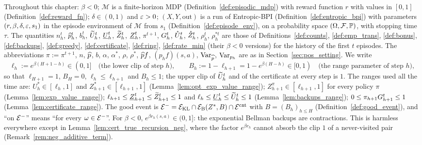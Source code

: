 Throughout this chapter: $\beta < 0$; $\mathcal M$ is a finite-horizon MDP
(Definition~\ref{def:episodic_mdp}) with reward function $r$ with values in $[0, 1]$
(Definition~\ref{def:reward_fn}); $\delta \in (0, 1)$ and $\varepsilon > 0$; $(X, Y, \mathrm{out})$ is a run
of Entropic-BPI (Definition~\ref{def:entropic_bpi}) with parameters $(r, \beta, \delta, \varepsilon, s_1)$
in the episode environment of $\mathcal M$ from $s_1$ (Definition~\ref{def:episode_env}), on a
probability space $(\Omega, \mathcal F, \mathbb{P})$, with stopping time $\tau$. The quantities $n_h^t$,
$\widehat{p}_h^t$, $b_h^t$, $\widetilde{U}_h^t$, $\underline{U}_h^t$, $\widetilde{Z}_h^t$, $\underline{Z}_h^t$, $\pi^{t+1}$, $G_h^t$, $\mathring{U}_h^t$, $\mathring{Z}_h^t$,
$\rho_h^t$, $\rho^{*t}_h$ are those of Definitions~\ref{def:counts}, \ref{def:emp_trans}, \ref{def:bonus},
\ref{def:backups}, \ref{def:greedy}, \ref{def:certificate}, \ref{def:ring}, \ref{def:rate_min}
(their $\beta < 0$ versions) for the history of the first $t$ episodes. The abbreviations
$\pi := \pi^{t+1}$, $n$, $\widehat{p}$, $b$, $\alpha$, $\alpha^*$, $\rho$, $\rho^*$, $\widehat{p} f$, $(p_hf)(s,a)$,
$\operatorname{Var}_{\widehat{p}}$, $\operatorname{Var}_{p_h}$ are as in Section~\ref{sec:pos_setting}. We write
\[
  \ell_h := e^{\beta(H + 1 - h)} \in (0, 1] \quad\text{(the lower clip of step $h$)}, \qquad
  B_h := 1 - \ell_{h+1} = 1 - e^{\beta(H-h)} \in [0, 1) \quad\text{(the range parameter of step $h$)},
\]
so that $\ell_{H+1} = 1$, $B_H = 0$, $\ell_h \le \ell_{h+1}$ and $B_h \le 1$; the upper clip of $\widetilde{U}^t_h$ and
of the certificate at every step is $1$. The ranges used all the time are: $U^*_h \in [\ell_h, 1]$ and
$Z^*_{h+1} \in [\ell_{h+1}, 1]$ (Lemma~\ref{lem:opt_exp_value_range}); $Z^\pi_{h+1} \in [\ell_{h+1}, 1]$ for every
policy $\pi$ (Lemma~\ref{lem:exp_value_range}); $\ell_{h+1} \le \underline{Z}^t_{h+1} \le \widetilde{Z}^t_{h+1} \le 1$ and
$\ell_h \le \underline{U}^t_h \le \widetilde{U}^t_h \le 1$ (Lemma~\ref{lem:backups_range}); $0 \le \pi_{h+1}G^t_{h+1} \le 1$
(Lemma~\ref{lem:certificate_range}). The good event is
$\mathcal{E}^- = \mathcal{E}_{\mathrm{KL}} \cap \mathcal{E}_{\mathrm{B}}(Z^*, B) \cap \mathcal{E}^{\mathrm{cnt}}$ with $B = (B_h)_{h \le H}$
(Definition~\ref{def:good_event}), and ``on $\mathcal{E}^-$'' means ``for every $\omega \in \mathcal{E}^-$''.
For $\beta < 0$, $e^{\beta r_h(s,a)} \in (0, 1]$: the exponential Bellman backups are contractions. This
is harmless everywhere except in Lemma~\ref{lem:cert_true_recursion_neg}, where the factor
$e^{\beta r_h}$ cannot absorb the clip $1$ of a never-visited pair (Remark~\ref{rem:neg_additive_term}).

